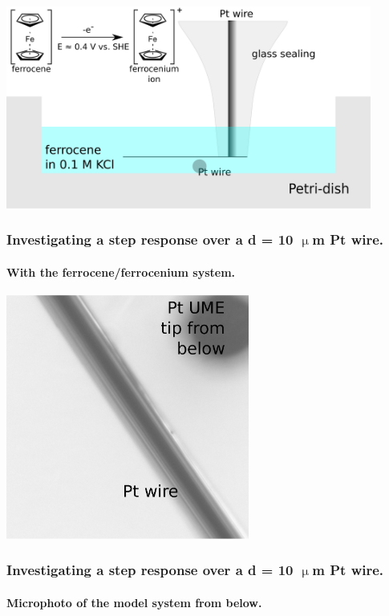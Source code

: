 \documentclass{beamer}
\begin{document}
\begin{frame}
        \centering
        \includegraphics[width=0.9\textwidth]{wire.eps}
        \frametitle{Investigating a step response over a d = 10 $\upmu$m Pt wire.}
        \framesubtitle{With the ferrocene/ferrocenium system.}
\vfill
\end{frame}

\begin{frame}
        \centering
        \includegraphics[width=0.6\textwidth]{wire_photo.eps}
        \frametitle{Investigating a step response over a d = 10 $\upmu$m Pt wire.}
        \framesubtitle{Microphoto of the model system from below.}
\vfill
\end{frame}
\end{document}
